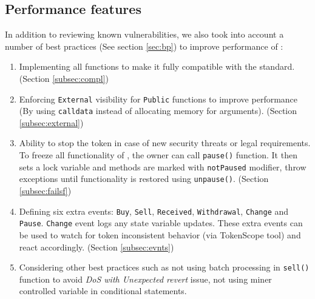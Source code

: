 {\subsection{Performance features}
In addition to reviewing known vulnerabilities, we also took into account a number of best practices (See section \ref{sec:bp}) to improve performance of \sys:
\begin{enumerate}[noitemsep,topsep=0pt]
	\item Implementing all functions to make it fully compatible with the \erc standard. (Section \ref{subsec:compl})

	\item Enforcing \texttt{External} visibility for \texttt{Public} functions to improve performance (By using \texttt{calldata} instead of allocating memory for arguments). (Section \ref{subsec:external})
	
	\item Ability to stop the token in case of new security threats or legal requirements. To freeze all functionality of \sys, the owner can call \texttt{pause()} function. It then sets a lock variable and methods are marked with \texttt{notPaused} modifier, throw exceptions until functionality is restored using \texttt{unpause()}. (Section \ref{subsec:failsf})

	\item Defining six extra events: \texttt{Buy}, \texttt{Sell}, \texttt{Received}, \texttt{Withdrawal}, \texttt{Change} and \texttt{Pause}. \texttt{Change} event logs any state variable updates. These extra events can be used to watch for token inconsistent behavior (\eg via TokenScope tool\cite{TokenScope}) and react accordingly. (Section \ref{subsec:evnts})

	\item Considering other best practices such as not using batch processing in \texttt{sell()} function to avoid \textit{DoS with Unexpected revert} issue, not using miner controlled variable in conditional statements. 
\end{enumerate}

}
